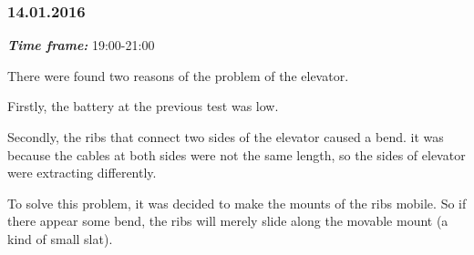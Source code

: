 \subsubsection{14.01.2016}
\textit{\textbf{Time frame:}} 19:00-21:00

There were found two reasons of the problem of the elevator.

Firstly, the battery at the previous test was low. 

Secondly, the ribs that connect two sides of the elevator caused a bend. it was because the cables at both sides were not the same length, so the sides of elevator were extracting differently.

To solve this problem, it was decided to make the mounts of the ribs mobile. So if there appear some bend, the ribs will merely slide along the movable mount (a kind of small slat).


